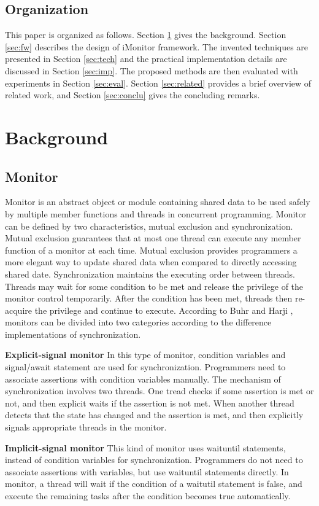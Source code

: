 \documentclass[preprint]{sigplanconf}
\begin{document}
\subsection{Organization}
This paper is organized as follows. Section \ref{sec:bg} gives the
background. Section \ref{sec:fw} describes the design of iMonitor
framework. The invented techniques are presented in Section \ref{sec:tech}
and the practical implementation details are discussed in Section 
\ref{sec:imp}. The proposed methods are then evaluated with experiments in 
Section \ref{sec:eval}. Section \ref{sec:related} provides a brief overview of
related work, and Section \ref{sec:conclu} gives the concluding remarks.

\section{Background} \label{sec:bg}
\subsection{Monitor}
Monitor is an abstract object or module containing shared data to be used safely
by multiple member functions and threads in concurrent programming. Monitor can
be defined by two characteristics, mutual exclusion and synchronization. Mutual 
exclusion guarantees that at most one thread can execute any member function of 
a monitor at each time. Mutual exclusion provides programmers a more elegant
way to update shared data when compared to directly accessing shared date. 
Synchronization maintains the executing order between threads. Threads may wait
for some condition to be met and release the privilege of the monitor control 
temporarily. After the condition has been met, threads then re-acquire the 
privilege and continue to execute.
According to Buhr and Harji \cite{bh05}, monitors can be divided into two 
categories according to the difference implementations of synchronization. 
\begin{description}
    \item{\bf Explicit-signal monitor} In this type of monitor, condition
    variables and signal/await statement are used for synchronization. 
    Programmers need to
    associate assertions with condition variables manually. The mechanism of
    synchronization involves two threads. One tread checks if some
    assertion is met or not, and then explicit waits if the assertion is not
    met. When another thread detects that the state has changed and the 
    assertion is met, and then explicitly signals appropriate threads in the 
    monitor.
    \item{\bf Implicit-signal monitor} This kind of monitor uses waituntil
    statements, instead of condition variables for
    synchronization. Programmers do not need to associate assertions with
    variables, but use waituntil statements directly. In
    monitor, a thread will wait if the condition of a waitutil
    statement is false, and execute the remaining tasks after the condition 
    becomes true automatically.
\end{description}
\end{document}
